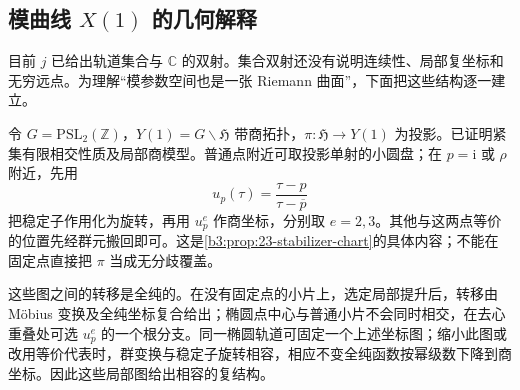 \subsection{模曲线 \texorpdfstring{\(X(1)\)}{X(1)} 的几何解释}
\label{b3:subsec:230604}

目前 \(j\) 已给出轨道集合与 \(\mathbb C\) 的双射。集合双射还没有说明连续性、局部复坐标和无穷远点。为理解“模参数空间也是一张 Riemann 曲面”，下面把这些结构逐一建立。

令 \(G=\mathrm{PSL}_2(\mathbb Z)\)，\(Y(1)=G\backslash\mathfrak H\) 带商拓扑，\(\pi:\mathfrak H\to Y(1)\) 为投影。已证明紧集有限相交性质及局部商模型。普通点附近可取投影单射的小圆盘；在 \(p=\mathrm i\) 或 \(\rho\) 附近，先用
\[
 u_p(\tau)=\frac{\tau-p}{\tau-\overline p}
\]
把稳定子作用化为旋转，再用 \(u_p^e\) 作商坐标，分别取 \(e=2,3\)。其他与这两点等价的位置先经群元搬回即可。这是\cref{b3:prop:23-stabilizer-chart}的具体内容；不能在固定点直接把 \(\pi\) 当成无分歧覆盖。

\ProseParagraphBreak
这些图之间的转移是全纯的。在没有固定点的小片上，选定局部提升后，转移由 Möbius 变换及全纯坐标复合给出；椭圆点中心与普通小片不会同时相交，在去心重叠处可选 \(u_p^e\) 的一个根分支。同一椭圆轨道可固定一个上述坐标图；缩小此图或改用等价代表时，群变换与稳定子旋转相容，相应不变全纯函数按幂级数下降到商坐标。因此这些局部图给出相容的复结构。

